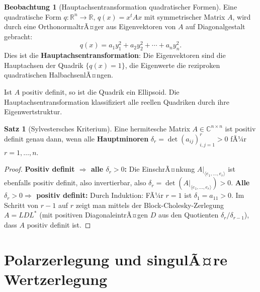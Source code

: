 ﻿\documentclass[a4paper,12pt]{report}
\theoremstyle{definition}
\newtheorem{satz}{Satz}
\newtheorem{beobachtung}{Beobachtung}
\begin{document}
\begin{beobachtung}[Hauptachsentransformation quadratischer Formen]
    Eine quadratische Form $q : \mathbb{R}^n \to \mathbb{R}$,
    $q(x) = x^t A x$ mit symmetrischer Matrix $A$, wird durch
    eine OrthonormaltrÃ¤ger aus Eigenvektoren von $A$ auf
    Diagonalgestalt gebracht:
    \[
        q(x) = a_1 y_1^2 + a_2 y_2^2 + \cdots + a_n y_n^2.
    \]
    Dies ist die \textbf{Hauptachsentransformation}: Die Eigenvektoren
    sind die Hauptachsen der Quadrik $\{q(x) = 1\}$, die Eigenwerte
    die reziproken quadratischen HalbachsenlÃ¤ngen.

    Ist $A$ positiv definit, so ist die Quadrik ein Ellipsoid.
    Die Hauptachsentransformation klassifiziert alle reellen Quadriken
    durch ihre Eigenwertstruktur.
\end{beobachtung}

\begin{satz}[Sylvestersches Kriterium]
    Eine hermitesche Matrix $A \in \mathbb{C}^{n \times n}$ ist positiv
    definit genau dann, wenn alle \textbf{Hauptminoren}
    $\delta_r = \det(a_{ij})_{i,j=1}^r > 0$ fÃ¼r $r = 1, \dots, n$.
\end{satz}
\begin{proof}
    \textbf{Positiv definit $\Rightarrow$ alle $\delta_r > 0$:} Die
    EinschrÃ¤nkung $A|_{\langle e_1,\ldots,e_r\rangle}$ ist ebenfalls positiv definit,
    also invertierbar, also $\delta_r = \det(A|_{\langle e_1,\ldots,e_r\rangle}) > 0$.
    \textbf{Alle $\delta_r > 0 \Rightarrow$ positiv definit:} Durch Induktion:
    FÃ¼r $r = 1$ ist $\delta_1 = a_{11} > 0$. Im Schritt von $r-1$ auf $r$ zeigt man
    mittels der Block-Cholesky-Zerlegung $A = L D L^*$ (mit positiven DiagonaleintrÃ¤gen
    $D$ aus den Quotienten $\delta_r / \delta_{r-1}$), dass $A$ positiv definit ist.
\end{proof}


\section{Polarzerlegung und singulÃ¤re Wertzerlegung}
\end{document}
